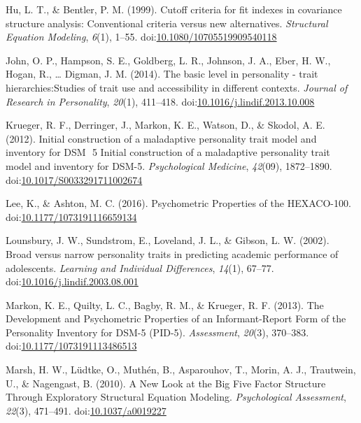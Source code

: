 \documentclass[man]{apa6}
\theoremstyle{definition}
\theoremstyle{definition}
\theoremstyle{definition}
\theoremstyle{remark}
\begin{document}
\leavevmode\hypertarget{ref-Hu1999}{}%
Hu, L. T., \& Bentler, P. M. (1999). Cutoff criteria for fit indexes in
covariance structure analysis: Conventional criteria versus new
alternatives. \emph{Structural Equation Modeling}, \emph{6}(1), 1--55.
doi:\href{https://doi.org/10.1080/10705519909540118}{10.1080/10705519909540118}

\leavevmode\hypertarget{ref-Ziegler2014}{}%
John, O. P., Hampson, S. E., Goldberg, L. R., Johnson, J. A., Eber, H.
W., Hogan, R., \ldots{} Digman, J. M. (2014). The basic level in
personality - trait hierarchies:Studies of trait use and accessibility
in different contexts. \emph{Journal of Research in Personality},
\emph{20}(1), 411--418.
doi:\href{https://doi.org/10.1016/j.lindif.2013.10.008}{10.1016/j.lindif.2013.10.008}

\leavevmode\hypertarget{ref-Krueger2012a}{}%
Krueger, R. F., Derringer, J., Markon, K. E., Watson, D., \& Skodol, A.
E. (2012). Initial construction of a maladaptive personality trait model
and inventory for DSM ­ 5 Initial construction of a maladaptive
personality trait model and inventory for DSM-5. \emph{Psychological
Medicine}, \emph{42}(09), 1872--1890.
doi:\href{https://doi.org/10.1017/S0033291711002674}{10.1017/S0033291711002674}

\leavevmode\hypertarget{ref-Lee2016}{}%
Lee, K., \& Ashton, M. C. (2016). Psychometric Properties of the
HEXACO-100.
doi:\href{https://doi.org/10.1177/1073191116659134}{10.1177/1073191116659134}

\leavevmode\hypertarget{ref-Lounsbury2002}{}%
Lounsbury, J. W., Sundstrom, E., Loveland, J. L., \& Gibson, L. W.
(2002). Broad versus narrow personality traits in predicting academic
performance of adolescents. \emph{Learning and Individual Differences},
\emph{14}(1), 67--77.
doi:\href{https://doi.org/10.1016/j.lindif.2003.08.001}{10.1016/j.lindif.2003.08.001}

\leavevmode\hypertarget{ref-Markon2013}{}%
Markon, K. E., Quilty, L. C., Bagby, R. M., \& Krueger, R. F. (2013).
The Development and Psychometric Properties of an Informant-Report Form
of the Personality Inventory for DSM-5 (PID-5). \emph{Assessment},
\emph{20}(3), 370--383.
doi:\href{https://doi.org/10.1177/1073191113486513}{10.1177/1073191113486513}

\leavevmode\hypertarget{ref-Marsh2010}{}%
Marsh, H. W., Lüdtke, O., Muthén, B., Asparouhov, T., Morin, A. J.,
Trautwein, U., \& Nagengast, B. (2010). A New Look at the Big Five
Factor Structure Through Exploratory Structural Equation Modeling.
\emph{Psychological Assessment}, \emph{22}(3), 471--491.
doi:\href{https://doi.org/10.1037/a0019227}{10.1037/a0019227}
\end{document}
